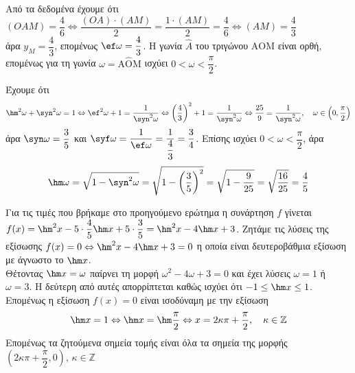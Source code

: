 \begin{alist}
\item Από τα δεδομένα έχουμε ότι $(OAM) = \dfrac{4}{6} \Leftrightarrow \dfrac{(OA)\cdot(AM)}{2} = \dfrac{1\cdot(AM)}{2} = \dfrac{4}{6} \Leftrightarrow (AM) = \dfrac{4}{3}$ \\
άρα $y_M = \dfrac{4}{3}$, επομένως $\ef \omega = \dfrac{4}{3}$. Η γωνία $\hat{A}$ του τριγώνου $\text{AOM}$ είναι ορθή, επομένως για τη γωνία $\omega = \text{A}\hat{\text{O}}\text{M}$ ισχύει $0 < \omega < \dfrac{\pi}{2}$.
\item Έχουμε ότι
\[\hm ^2\omega + \syn ^2\omega = 1 \Leftrightarrow \ef ^2\omega + 1 = \frac{1}{\syn ^2\omega} \Leftrightarrow \left(\frac{4}{3}\right)^2 + 1 = \frac{1}{\syn ^2\omega} \Leftrightarrow \frac{25}{9} = \frac{1}{\syn ^2\omega}, \quad \omega \in \left(0, \frac{\pi}{2}\right)\]
άρα $\syn \omega = \dfrac{3}{5}$ και $\syf \omega = \dfrac{1}{\ef \omega} = \dfrac{1}{\dfrac{4}{3}} = \dfrac{3}{4}$. Επίσης ισχύει $0 < \omega < \dfrac{\pi}{2}$, άρα
\[\hm \omega = \sqrt{1 - \syn ^2\omega} = \sqrt{1 - \left(\frac{3}{5}\right)^2} = \sqrt{1 - \frac{9}{25}} = \sqrt{\frac{16}{25}} = \frac{4}{5}\]
\item Για τις τιμές που βρήκαμε στο προηγούμενο ερώτημα η συνάρτηση $f$ γίνεται $f(x) = \hm ^2x - 5\cdot\dfrac{4}{5}\hm  x + 5\cdot\dfrac{3}{5} = \hm ^2x - 4\hm  x + 3$. Ζητάμε τις λύσεις της εξίσωσης $f(x) = 0 \Leftrightarrow \hm ^2x - 4\hm  x + 3 = 0$ η οποία είναι δευτεροβάθμια εξίσωση με άγνωστο το $\hm  x$. \\
Θέτοντας $\hm  x = \omega$ παίρνει τη μορφή $\omega^2 - 4\omega + 3 = 0$ και έχει λύσεις $\omega = 1$ ή $\omega = 3$. Η δεύτερη από αυτές απορρίπτεται καθώς ισχύει ότι $-1 \le \hm  x \le 1$. Επομένως η εξίσωση $f(x) = 0$ είναι ισοδύναμη με την εξίσωση 
\[\hm  x = 1 \Leftrightarrow \hm  x = \hm \frac{\pi}{2} \Leftrightarrow x = 2\kappa\pi + \frac{\pi}{2}, \quad \kappa \in \mathbb{Z}\]
Επομένως τα ζητούμενα σημεία τομής είναι όλα τα σημεία της μορφής $\left(2\kappa\pi + \dfrac{\pi}{2}, 0\right), \, \kappa \in \mathbb{Z}$
\end{alist}

